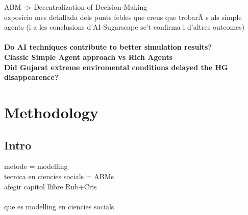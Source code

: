 \documentclass{report}
\begin{document}
ABM -> Decentralization of Decision-Making
\\
exposicio mes detallada dels punts febles que creus que trobarÃ s als simple agents (i a les conclusions d'AI-Sugarscape se't confirma 
i d'altres outcomes)
\\
\\
\indent \textbf{Do AI techniques contribute to better simulation results?}\\
\indent \textbf{Classic Simple Agent approach vs Rich Agents}\\
\indent \textbf{Did Gujarat extreme enviromental conditions delayed the HG disappearence?}\\
\newpage 
\chapter{Methodology}




\section{Intro}

metode = modelling\\
tecnica en ciencies socials = ABMs \\
afegir capitol llibre Rub+Cris\\
\\
que es modelling en ciencies socials 
\\

\end{document}
